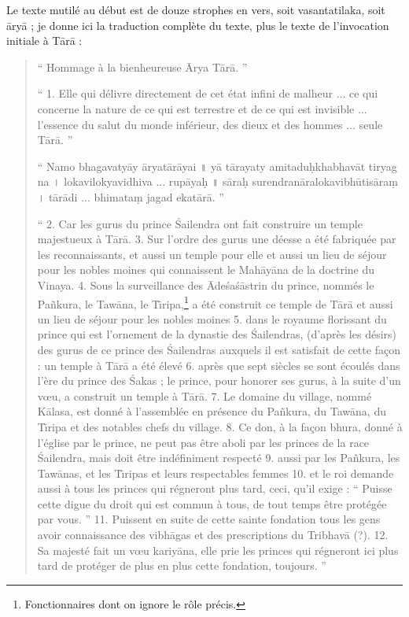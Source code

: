 \documentclass[a4paper, 11pt, oneside, french]{article}
\begin{document}
Le texte mutilé au début est de douze strophes en vers, soit vasantatilaka, soit \={a}ry\={a} ; je donne ici la traduction complète du texte, plus le texte de l'invocation initiale à T\={a}r\={a} :
\begin{quotation}
`` Hommage à la bienheureuse \={A}rya T\={a}r\={a}. ''

\bigskip

`` 1. Elle qui délivre directement de cet état infini de malheur ... ce qui concerne la nature de ce qui est terrestre et de ce qui est invisible ... l'essence du salut du monde inférieur, des dieux et des hommes ... seule T\={a}r\={a}. ''

`` Namo bhagavaty\={a}y \={a}ryat\={a}r\={a}yai \texthindi{॥} y\={a} t\={a}rayaty amitadu\d{h}khabhav\={a}t tiryag na \texthindi{।} lokavilokyavidhiva ... rup\={a}ya\d{h} \texthindi{॥} s\={a}ra\d{h} surendran\={a}ralokavibh\={u}tis\={a}ra\d{m} \texthindi{।} t\={a}r\={a}di ... bhimata\d{m} jagad ekat\={a}r\={a}. ''

\bigskip

`` 2. Car les gurus du prince \'{S}ailendra ont fait construire un temple majestueux à T\={a}r\={a}. 3. Sur l'ordre des gurus une déesse a été fabriquée par les reconnaissants, et aussi un temple pour elle et aussi un lieu de séjour pour les nobles moines qui connaissent le Mah\={a}y\={a}na de la doctrine du Vinaya. 4. Sous la surveillance des \={A}de\'{s}a\'{s}\={a}strin du prince, nommés le Pa\~{n}kura, le Taw\={a}na, le T\={\i}ripa,\footnote{Fonctionnaires dont on ignore le rôle précis.} a été construit ce temple de T\={a}r\={a} et aussi un lieu de séjour pour les nobles moines 5. dans le royaume florissant du prince qui est l'ornement de la dynastie des \'{S}ailendras, (d'après les désirs) des gurus de ce prince des \'{S}ailendras auxquels il est satisfait de cette façon : un temple à T\={a}r\={a} a été élevé 6. après que sept siècles se sont écoulés dans l'ère du prince des \'{S}akas ; le prince, pour honorer ses gurus, à la suite d'un vœu, a construit un temple à T\={a}r\={a}. 7. Le domaine du village, nommé K\={a}lasa, est donné à l'assemblée en présence du Pa\~{n}kura, du Taw\={a}na, du T\={\i}ripa et des notables chefs du village. 8. Ce don, à la façon bhura, donné à l'église par le prince, ne peut pas être aboli par les princes de la race \'{S}ailendra, mais doit être indéfiniment respecté 9. aussi par les Pa\~{n}kura, les Taw\={a}nas, et les T\={\i}ripas et leurs respectables femmes 10. et le roi demande aussi à tous les princes qui régneront plus tard, ceci, qu'il exige : `` Puisse cette digue du droit qui est commun à tous, de tout temps être protégée par vous. '' 11. Puissent en suite de cette sainte fondation tous les gens avoir connaissance des vibh\={a}gas et des prescriptions du Tribhav\={a} (?). 12. Sa majesté fait un vœu kariy\={a}na, elle prie les princes qui régneront ici plus tard de protéger de plus en plus cette fondation, toujours. ''
\end{quotation}
\end{document}
